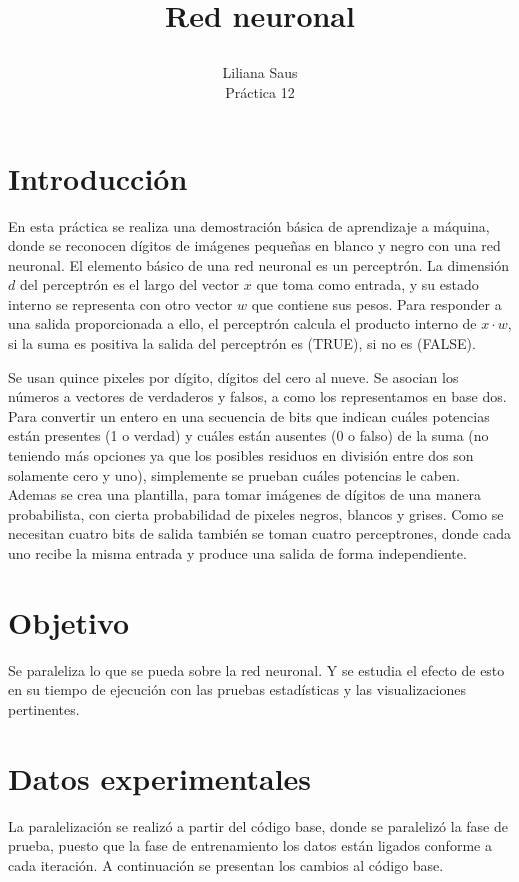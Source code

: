 \documentclass[10pt,a4paper]{article}
\author{Liliana Saus \\ Práctica 12}
\title{Red neuronal \\   \begin{large}
\end{large}}
\begin{document}
\maketitle

\section*{Introducción}

En esta práctica se realiza una demostración básica de aprendizaje a máquina, donde se reconocen dígitos de imágenes pequeñas en blanco y negro con una red neuronal. El elemento básico de una red neuronal es un perceptrón. La dimensión $d$ del perceptrón es el largo del vector $x$ que toma como entrada, y su estado interno se representa con otro vector $w$ que contiene sus pesos. Para responder a una salida proporcionada a ello, el perceptrón calcula el producto interno de $x \cdot w$, si la suma es positiva la salida del perceptrón es (TRUE), si no es (FALSE). 

Se usan quince pixeles por dígito, dígitos del cero al nueve. Se asocian los números a vectores de verdaderos y falsos, a como los representamos en base dos. Para convertir un entero en una secuencia de bits que indican cuáles potencias están presentes (1 o verdad) y cuáles están ausentes (0 o falso) de la suma (no teniendo más opciones ya que los posibles residuos en división entre dos son solamente cero y uno), simplemente se prueban cuáles potencias le caben. 
Ademas se crea una plantilla, para tomar imágenes de dígitos de una manera probabilista, con cierta probabilidad de pixeles negros, blancos y grises. Como se necesitan cuatro bits de salida también se toman cuatro perceptrones, donde cada uno recibe la misma entrada y produce una salida de forma independiente. 

\vspace{0.5cm}

\section*{Objetivo} 
Se paraleliza lo que se pueda sobre la red neuronal. Y se estudia el efecto de esto en su tiempo de ejecución con las pruebas estadísticas y las visualizaciones pertinentes.
\section*{Datos experimentales }
La paralelización se realizó  a partir del código base, donde se paralelizó la fase de prueba, puesto que la fase de entrenamiento los datos están ligados conforme a cada iteración. A continuación se presentan los cambios al código base. 
\end{document}
